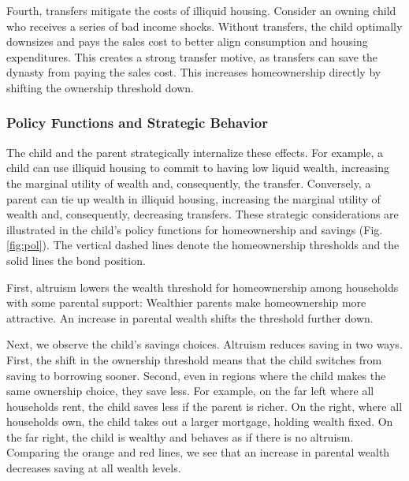 \documentclass[12pt]{article}
\begin{document}
Fourth, transfers mitigate the costs of illiquid housing. Consider an owning child who receives a series of bad income shocks. Without transfers, the child optimally downsizes and pays the sales cost to better align consumption and housing expenditures. This creates a strong transfer motive, as transfers can save the dynasty from paying the sales cost. This increases homeownership directly by shifting the ownership threshold down.

\subsubsection{Policy Functions and Strategic Behavior}\label{sec:policyfuncs}
The child and the parent strategically internalize these effects. For example, a child can use illiquid housing to commit to having low liquid wealth, increasing the marginal utility of wealth and, consequently, the transfer. Conversely, a parent can tie up wealth in illiquid housing, increasing the marginal utility of wealth and, consequently, decreasing transfers. These strategic considerations are illustrated in the child's policy functions for homeownership and savings (Fig. \ref{fig:pol}). The vertical dashed lines denote the homeownership thresholds and the solid lines the bond position.

First, altruism lowers the wealth threshold for homeownership among households with some parental support: Wealthier parents make homeownership more attractive. An increase in parental wealth shifts the threshold further down.

Next, we observe the child's savings choices. Altruism reduces saving in two ways. First, the shift in the ownership threshold means that the child switches from saving to borrowing sooner. Second, even in regions where the child makes the same ownership choice, they save less. For example, on the far left where all households rent, the child saves less if the parent is richer. On the right, where all households own, the child takes out a larger mortgage, holding wealth fixed. On the far right, the child is wealthy and behaves as if there is no altruism. Comparing the orange and red lines, we see that an increase in parental wealth decreases saving at all wealth levels.
\end{document}

